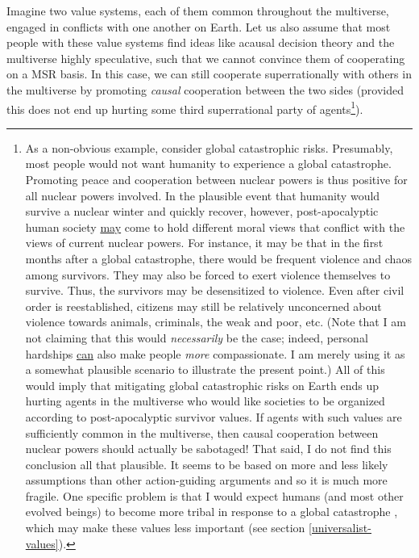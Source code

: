 Imagine two value systems, each of them common throughout the
multiverse, engaged in conflicts with one another on Earth. Let us also
assume that most people with these value systems find ideas like acausal
decision theory and the multiverse highly speculative, such that we
cannot convince them of cooperating on a MSR basis. In this case, we can
still cooperate superrationally with others in the multiverse by
promoting \emph{causal} cooperation between the two sides (provided this
does not end up hurting some third superrational party of
agents\footnote{As a non-obvious example, consider global catastrophic
  risks. Presumably, most people would not want humanity to experience a
  global catastrophe. Promoting peace and cooperation between nuclear
  powers is thus positive for all nuclear powers involved. In the
  plausible event that humanity would survive a nuclear winter and
  quickly recover, however, post-apocalyptic human society
  \href{https://foundational-research.org/how-would-catastrophic-risks-affect-prospects-for-compromise/\#Other_costs_to_catastrophes}{may}
  come to hold different moral views that conflict with the views of
  current nuclear powers. For instance, it may be that in the first
  months after a global catastrophe, there would be frequent violence
  and chaos among survivors. They may also be forced to exert violence
  themselves to survive. Thus, the survivors may be desensitized to
  violence. Even after civil order is reestablished, citizens may still
  be relatively unconcerned about violence towards animals, criminals,
  the weak and poor, etc. (Note that I am not claiming that this would
  \emph{necessarily} be the case; indeed, personal hardships
  \href{http://reducing-suffering.org/how-important-is-experiencing-suffering-for-caring-about-suffering/}{can}
  also make people \emph{more} compassionate. I am merely using it as a
  somewhat plausible scenario to illustrate the present point.) All of
  this would imply that mitigating global catastrophic risks on Earth
  ends up hurting agents in the multiverse who would like societies to
  be organized according to post-apocalyptic survivor values. If agents
  with such values are sufficiently common in the multiverse, then
  causal cooperation between nuclear powers should actually be
  sabotaged! That said, I do not find this conclusion all that
  plausible. It seems to be based on more and less likely assumptions
  than other action-guiding arguments and so it is much more fragile.
  One specific problem is that I would expect humans (and most other
  evolved beings) to become more tribal in response to a global
  catastrophe \parencite[chapter 11, section ``War, External Threats, and Norm
  Adherence'']{Henrich2015-xe}, which may make
  these values less important (see section
  \ref{universalist-values}).}).


